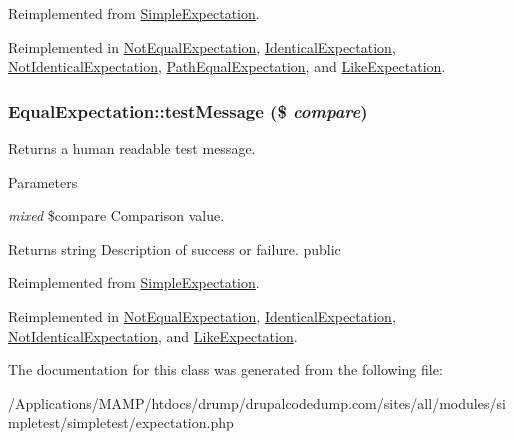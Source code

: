 Reimplemented from \hyperlink{class_simple_expectation_aa2b98f827e7487ebe12cedb9ad39d061}{SimpleExpectation}.

Reimplemented in \hyperlink{class_not_equal_expectation_a4d224959c7900fa36eadb05907129d4c}{NotEqualExpectation}, \hyperlink{class_identical_expectation_a6076cd232c16294ca0a7979ce11e57da}{IdenticalExpectation}, \hyperlink{class_not_identical_expectation_a2e3d68e7804396cb418a9ef2d00c128e}{NotIdenticalExpectation}, \hyperlink{class_path_equal_expectation_a8a557e7891f14b36955c89e142cdac95}{PathEqualExpectation}, and \hyperlink{class_like_expectation_a58e0a803b7016efd6516fea5d9753f82}{LikeExpectation}.\hypertarget{class_equal_expectation_a707aa690ff9312ff1b99733d859f7f6f}{
\subsubsection[{testMessage}]{\setlength{\rightskip}{0pt plus 5cm}EqualExpectation::testMessage (\$ {\em compare})}}
\label{class_equal_expectation_a707aa690ff9312ff1b99733d859f7f6f}
Returns a human readable test message. 
\begin{DoxyParams}{Parameters}
\item[{\em mixed}]\$compare Comparison value. \end{DoxyParams}
\begin{DoxyReturn}{Returns}
string Description of success or failure.  public 
\end{DoxyReturn}


Reimplemented from \hyperlink{class_simple_expectation_a15b69edf659c76f6543aa98d8d85b025}{SimpleExpectation}.

Reimplemented in \hyperlink{class_not_equal_expectation_acdebe1e65b7080f419bdaad3a15981a0}{NotEqualExpectation}, \hyperlink{class_identical_expectation_a80c36b4efb3126695a69d4823ab3122b}{IdenticalExpectation}, \hyperlink{class_not_identical_expectation_a4d2927f2f29f63f7cff7e0e24a555d85}{NotIdenticalExpectation}, and \hyperlink{class_like_expectation_a421ebb1546193d32db6461d930150052}{LikeExpectation}.

The documentation for this class was generated from the following file:\begin{DoxyCompactItemize}
\item 
/Applications/MAMP/htdocs/drump/drupalcodedump.com/sites/all/modules/simpletest/simpletest/expectation.php\end{DoxyCompactItemize}
